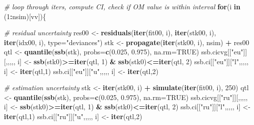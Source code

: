 \documentclass[
]{book}
\newenvironment{Shaded}{\begin{snugshade}}{\end{snugshade}}
\newcommand{\AttributeTok}[1]{\textcolor[rgb]{0.13,0.29,0.53}{#1}}
\newcommand{\CommentTok}[1]{\textcolor[rgb]{0.56,0.35,0.01}{\textit{#1}}}
\newcommand{\ConstantTok}[1]{\textcolor[rgb]{0.56,0.35,0.01}{#1}}
\newcommand{\ControlFlowTok}[1]{\textcolor[rgb]{0.13,0.29,0.53}{\textbf{#1}}}
\newcommand{\DecValTok}[1]{\textcolor[rgb]{0.00,0.00,0.81}{#1}}
\newcommand{\FloatTok}[1]{\textcolor[rgb]{0.00,0.00,0.81}{#1}}
\newcommand{\FunctionTok}[1]{\textcolor[rgb]{0.13,0.29,0.53}{\textbf{#1}}}
\newcommand{\NormalTok}[1]{#1}
\newcommand{\OtherTok}[1]{\textcolor[rgb]{0.56,0.35,0.01}{#1}}
\newcommand{\SpecialCharTok}[1]{\textcolor[rgb]{0.81,0.36,0.00}{\textbf{#1}}}
\newcommand{\StringTok}[1]{\textcolor[rgb]{0.31,0.60,0.02}{#1}}
\begin{document}
\begin{Shaded}
\begin{Highlighting}[]
\CommentTok{\# loop through iters, compute CI, check if OM value is within interval}
\ControlFlowTok{for}\NormalTok{(i }\ControlFlowTok{in}\NormalTok{ (}\DecValTok{1}\SpecialCharTok{:}\NormalTok{nsim)[vv])\{}

  \CommentTok{\# residual uncertainty}
\NormalTok{  res00 }\OtherTok{\textless{}{-}} \FunctionTok{residuals}\NormalTok{(}\FunctionTok{iter}\NormalTok{(fit00, i), }\FunctionTok{iter}\NormalTok{(stk00, i), }\FunctionTok{iter}\NormalTok{(idx00, i), }\AttributeTok{type=}\StringTok{"deviances"}\NormalTok{)}
\NormalTok{  stk }\OtherTok{\textless{}{-}} \FunctionTok{propagate}\NormalTok{(}\FunctionTok{iter}\NormalTok{(stk00, i), nsim) }\SpecialCharTok{+}\NormalTok{ res00}
\NormalTok{  qtl }\OtherTok{\textless{}{-}} \FunctionTok{quantile}\NormalTok{(}\FunctionTok{ssb}\NormalTok{(stk), }\AttributeTok{probs=}\FunctionTok{c}\NormalTok{(}\FloatTok{0.025}\NormalTok{, }\FloatTok{0.975}\NormalTok{), }\AttributeTok{na.rm=}\ConstantTok{TRUE}\NormalTok{)}
\NormalTok{  ssb.cicvg[[}\StringTok{"eu"}\NormalTok{]][,,,,, i] }\OtherTok{\textless{}{-}} \FunctionTok{ssb}\NormalTok{(stk0)}\SpecialCharTok{\textgreater{}=}\FunctionTok{iter}\NormalTok{(qtl, }\DecValTok{1}\NormalTok{) }\SpecialCharTok{\&} \FunctionTok{ssb}\NormalTok{(stk0)}\SpecialCharTok{\textless{}=}\FunctionTok{iter}\NormalTok{(qtl, }\DecValTok{2}\NormalTok{)}
\NormalTok{  ssb.ci[[}\StringTok{"eu"}\NormalTok{]][}\StringTok{"l"}\NormalTok{,,,,, i] }\OtherTok{\textless{}{-}} \FunctionTok{iter}\NormalTok{(qtl,}\DecValTok{1}\NormalTok{)}
\NormalTok{  ssb.ci[[}\StringTok{"eu"}\NormalTok{]][}\StringTok{"u"}\NormalTok{,,,,, i] }\OtherTok{\textless{}{-}} \FunctionTok{iter}\NormalTok{(qtl,}\DecValTok{2}\NormalTok{)}

  \CommentTok{\# estimation uncertainty}
\NormalTok{  stk }\OtherTok{\textless{}{-}} \FunctionTok{iter}\NormalTok{(stk00, i) }\SpecialCharTok{+} \FunctionTok{simulate}\NormalTok{(}\FunctionTok{iter}\NormalTok{(fit00, i), }\DecValTok{250}\NormalTok{)}
\NormalTok{  qtl }\OtherTok{\textless{}{-}} \FunctionTok{quantile}\NormalTok{(}\FunctionTok{ssb}\NormalTok{(stk), }\AttributeTok{probs=}\FunctionTok{c}\NormalTok{(}\FloatTok{0.025}\NormalTok{, }\FloatTok{0.975}\NormalTok{), }\AttributeTok{na.rm=}\ConstantTok{TRUE}\NormalTok{)}
\NormalTok{  ssb.cicvg[[}\StringTok{"ru"}\NormalTok{]][,,,,, i] }\OtherTok{\textless{}{-}} \FunctionTok{ssb}\NormalTok{(stk0)}\SpecialCharTok{\textgreater{}=}\FunctionTok{iter}\NormalTok{(qtl, }\DecValTok{1}\NormalTok{) }\SpecialCharTok{\&} \FunctionTok{ssb}\NormalTok{(stk0)}\SpecialCharTok{\textless{}=}\FunctionTok{iter}\NormalTok{(qtl, }\DecValTok{2}\NormalTok{)}
\NormalTok{  ssb.ci[[}\StringTok{"ru"}\NormalTok{]][}\StringTok{"l"}\NormalTok{,,,,, i] }\OtherTok{\textless{}{-}} \FunctionTok{iter}\NormalTok{(qtl,}\DecValTok{1}\NormalTok{)}
\NormalTok{  ssb.ci[[}\StringTok{"ru"}\NormalTok{]][}\StringTok{"u"}\NormalTok{,,,,, i] }\OtherTok{\textless{}{-}} \FunctionTok{iter}\NormalTok{(qtl,}\DecValTok{2}\NormalTok{)}


\end{Highlighting}
\end{Shaded}
\end{document}
